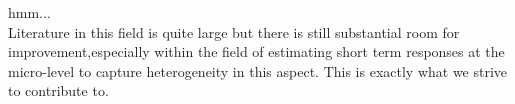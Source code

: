 \label{sec:conclusion}
hmm...
\medskip \\
Literature in this field is quite large but there is still substantial room for improvement,especially within the field of estimating short term responses at the micro-level to capture heterogeneity in this aspect. This is exactly what we strive to contribute to.
